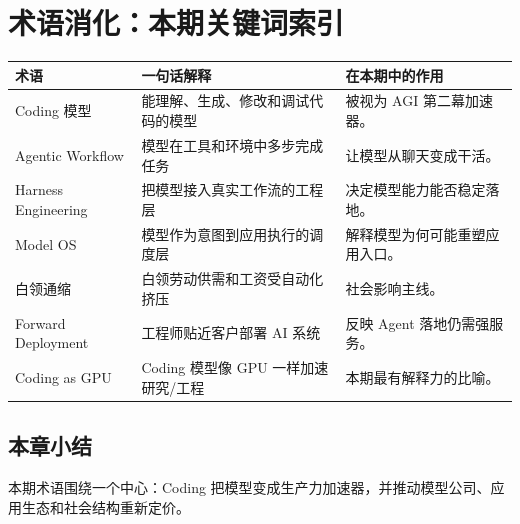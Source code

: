 \section{术语消化：本期关键词索引}

\begin{longtable}{p{}p{}p{}}
\toprule
术语 & 一句话解释 & 在本期中的作用 \\
\midrule
Coding 模型 & 能理解、生成、修改和调试代码的模型 & 被视为 AGI 第二幕加速器。 \\
Agentic Workflow & 模型在工具和环境中多步完成任务 & 让模型从聊天变成干活。 \\
Harness Engineering & 把模型接入真实工作流的工程层 & 决定模型能力能否稳定落地。 \\
Model OS & 模型作为意图到应用执行的调度层 & 解释模型为何可能重塑应用入口。 \\
白领通缩 & 白领劳动供需和工资受自动化挤压 & 社会影响主线。 \\
Forward Deployment & 工程师贴近客户部署 AI 系统 & 反映 Agent 落地仍需强服务。 \\
Coding as GPU & Coding 模型像 GPU 一样加速研究/工程 & 本期最有解释力的比喻。 \\
\bottomrule
\end{longtable}

\subsection{本章小结}

本期术语围绕一个中心：Coding 把模型变成生产力加速器，并推动模型公司、应用生态和社会结构重新定价。


